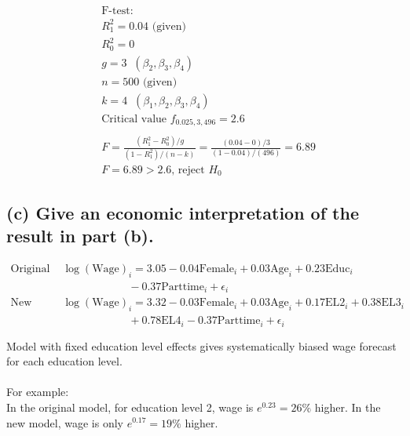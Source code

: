 \documentclass[12pt, a4paper]{article}
\begin{document}
\begin{align*}
    &\text{F-test}:\\
    &R_1^2 = 0.04 \text{ (given)}\\
    &R_0^2 = 0\\
    &g = 3 \;\; (\beta_2, \beta_3, \beta_4)\\
    &n = 500 \text{ (given)}\\
    &k = 4\;\; (\beta_1, \beta_2, \beta_3, \beta_4)\\
    &\text{Critical value }f_{0.025, 3, 496} = 2.6 \\\\
    &F = \frac{(R_1^2 - R_0^2)/g}{(1-R^2_1)/(n-k)} = \frac{(0.04 - 0)/3}{(1-0.04)/(496)} = 6.89\\
    &F = 6.89 > 2.6\text{, reject }H_0
\end{align*}
\vspace{1em}

\subsection*{(c) Give an economic interpretation of the result in part (b).}
\begin{align*}
    \text{Original }& \log(\text{Wage})_i = 3.05 - 0.04 \text{Female}_i + 0.03 \text{Age}_i + 0.23 \text{Educ}_i \\
    &\qquad\qquad\qquad-0.37 \text{Parttime}_i + \epsilon_i\\
    \text{New }&\log(\text{Wage})_i = 3.32 -0.03 \text{Female}_i + 0.03 \text{Age}_i + 0.17 \text{EL2}_i+ 0.38 \text{EL3}_i\\
    &\qquad\qquad\qquad+ 0.78 \text{EL4}_i-0.37 \text{Parttime}_i + \epsilon_i\\\\
\end{align*}
Model with fixed education level effects gives systematically biased wage forecast for each education level.\\\\
For example:\\
In the original model, for education level 2, wage is $e^{0.23} = 26\%$ higher. In the new model, wage is only $e^{0.17} = 19\%$ higher. 
\vspace{1em}
\end{document}
